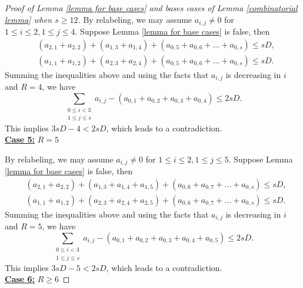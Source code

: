\documentclass[11pt]{amsart}
\theoremstyle{plain} %
\theoremstyle{remark}
\numberwithin{equation}{section}
\begin{document}
\begin{proof}[Proof of Lemma \ref{lemma for base cases} and bases cases of Lemma \ref{combinatorial lemma} when $s\geq 12$]
    By relabeling, we may assume $a_{i,j}\neq 0$ for $1\leq i\leq 2,1\leq j\leq 4$. Suppose Lemma \ref{lemma for base cases} is false, then
    \begin{align*}
        &(a_{2,1}+a_{2,2})+(a_{1,3}+a_{1,4})+(a_{0,5}+a_{0,6}+...+a_{0,s})\leq sD,\\
        &(a_{1,1}+a_{1,2})+(a_{2,3}+a_{2,4})+(a_{0,5}+a_{0,6}+...+a_{0,s})\leq sD.
    \end{align*}
    Summing the inequalities above and using the facts that $a_{i,j}$ is decreasing in $i$ and $R=4$, we have
    \begin{equation*}
        \sum_{\substack{0\leq i<3\\1\leq j\leq s}}a_{i,j}-(a_{0,1}+a_{0,2}+a_{0,3}+a_{0,4})\leq 2sD.
    \end{equation*}
    This implies $3sD-4<2sD$, which leads to a contradiction.\\

    \noindent\underline{\textbf{Case 5:}} $R=5$

    By relabeling, we may assume $a_{i,j}\neq 0$ for $1\leq i\leq 2,1\leq j\leq 5$. Suppose Lemma \ref{lemma for base cases} is false, then
    \begin{align*}
        &(a_{2,1}+a_{2,2})+(a_{1,3}+a_{1,4}+a_{1,5})+(a_{0,6}+a_{0,7}+...+a_{0,s})\leq sD,\\
        &(a_{1,1}+a_{1,2})+(a_{2,3}+a_{2,4}+a_{2,5})+(a_{0,6}+a_{0,7}+...+a_{0,s})\leq sD.
    \end{align*}
    Summing the inequalities above and using the facts that $a_{i,j}$ is decreasing in $i$ and $R=5$, we have
    \begin{equation*}
        \sum_{\substack{0\leq i<3\\1\leq j\leq s}}a_{i,j}-(a_{0,1}+a_{0,2}+a_{0,3}+a_{0,4}+a_{0,5})\leq 2sD.
    \end{equation*}
    This implies $3sD-5<2sD$, which leads to a contradiction.\\

    \noindent\underline{\textbf{Case 6:}} $R\geq 6$


\end{proof}
\end{document}
